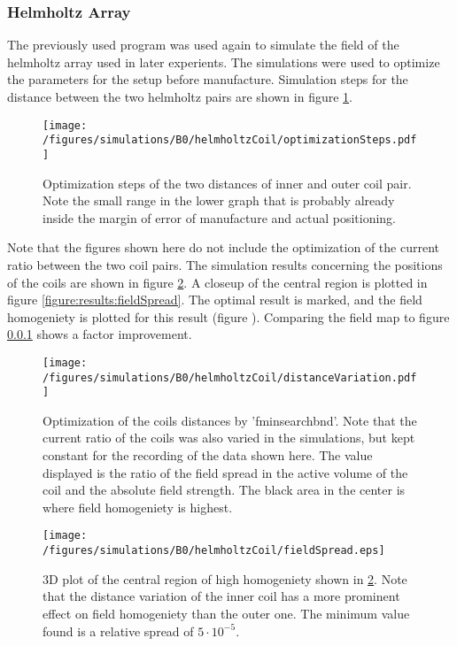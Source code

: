         \subsubsection{Helmholtz Array}
        The previously used program was used again to simulate the field of the helmholtz array used in later experients. The simulations were used to optimize the parameters for the setup before manufacture. Simulation steps for the distance between the two helmholtz pairs are shown in figure \ref{fig:results:optimizationSteps}.
        \begin{figure}
            \centering
            \texttt{[image: /figures/simulations/B0/helmholtzCoil/optimizationSteps.pdf]}
            \caption{Optimization steps of the two distances of inner and outer coil pair. Note the small range in the lower graph that is probably already inside the margin of error of manufacture and actual positioning.}
            \label{fig:results:optimizationSteps}
        \end{figure}
        Note that the figures shown here do not include the optimization of the current ratio between the two coil pairs. The simulation results concerning the positions of the coils are shown in figure \ref{fig:results:distanceVariation}. A closeup of the central region is plotted in figure \ref{figure:results:fieldSpread}. The optimal result is marked, and the field homogeniety is plotted for this result (figure ). Comparing the field map to figure \ref{} shows a factor  improvement.
        \begin{figure}
           \centering
           \texttt{[image: /figures/simulations/B0/helmholtzCoil/distanceVariation.pdf]}
           \label{fig:results:distanceVariation}
           \caption{Optimization of the coils distances by 'fminsearchbnd'. Note that the current ratio of the coils was also varied in the simulations, but kept constant for the recording of the data shown here. The value displayed is the ratio of the field spread in the active volume of the coil and the absolute field strength. The black area in the center is where field homogeniety is highest.}
        \end{figure}
        \begin{figure}
            \texttt{[image: /figures/simulations/B0/helmholtzCoil/fieldSpread.eps]}
            \label{fig:results:fieldSpread}
            \caption{3D plot of the central region of high homogeniety shown in \ref{fig:results:distanceVariation}. Note that the distance variation of the inner coil has a more prominent effect on field homogeniety than the outer one. The minimum value found is a relative spread of $5\cdot 10^{-5}$.}
        \end{figure}
